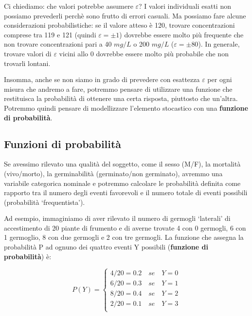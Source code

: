 \documentclass[a4paper,12pt,oneside]{book}
\begin{document}
Ci chiediamo: che valori potrebbe assumere \(\varepsilon\)? I valori individuali esatti non possiamo prevederli perchè sono frutto di errori casuali. Ma possiamo fare alcune considerazioni probabilistiche: se il valore atteso è 120, trovare concentrazioni comprese tra 119 e 121 (quindi \(\varepsilon = \pm 1\)) dovrebbe essere molto più frequente che non trovare concentrazioni pari a 40 \(mg/L\) o 200 \(mg/L\) (\(\varepsilon = \pm 80\)). In generale, trovare valori di \(\varepsilon\) vicini allo 0 dovrebbe essere molto più probabile che non trovarli lontani.

Insomma, anche se non siamo in grado di prevedere con esattezza \(\varepsilon\) per ogni misura che andremo a fare, potremmo pensare di utilizzare una funzione che restituisca la probabilità di ottenere una certa risposta, piuttosto che un'altra. Potremmo quindi pensare di modellizzare l'elemento stocastico con una \textbf{funzione di probabilità}.

\hypertarget{funzioni-di-probabilituxe0}{%
\subsection{Funzioni di probabilità}\label{funzioni-di-probabilituxe0}}

Se avessimo rilevato una qualità del soggetto, come il sesso (M/F), la mortalità (vivo/morto), la germinabilità (germinato/non germinato), avremmo una variabile categorica nominale e potremmo calcolare le probabilità definita come rapporto tra il numero degli eventi favorevoli e il numero totale di eventi possibili (probabilità `frequentista').

Ad esempio, immaginiamo di aver rilevato il numero di germogli `laterali' di accestimento di 20 piante di frumento e di averne trovate 4 con 0 germogli, 6 con 1 germoglio, 8 con due germogli e 2 con tre germogli. La funzione che assegna la probabilità P ad ognuno dei quattro eventi Y possibili (\textbf{funzione di probabilità}) è:

\[
P(Y) = \left\{ \begin{array}{l}
 4/20 = 0.2 \,\,\,\,\,\,se\,\,\,\,\,\,Y = 0 \\ 
 6/20 = 0.3 \,\,\,\,\,\,se\,\,\,\,\,\,Y = 1 \\ 
 8/20 = 0.4\,\,\,\,\,\,se\,\,\,\,\,\, Y = 2 \\ 
 2/20 = 0.1 \,\,\,\,\,\,se\,\,\,\,\,\,Y = 3 \\ 
 \end{array} \right.
\]
\end{document}
